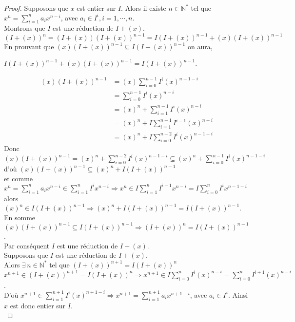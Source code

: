 \begin{proof}
	Supposons que $x$ est entier sur $I$. Alors il existe $n \in \mathbb{N^*}$ tel que $x^n = \displaystyle \sum_{i=1}^{n}{a_i x^{n-i}}$, avec $a_i \in I^i, i=1, \cdots ,n$.\\
	Montrons que $I$ est une réduction de $I + (x)$.\\
	$(I+(x))^n = (I+(x))(I+(x))^{n-1}= I(I+(x))^{n-1} + (x)(I+(x))^{n-1}$\\
	En prouvant que $(x)(I+(x))^{n-1} \subseteq I(I+(x))^{n-1}$ on aura,
	\begin{center}
		$I(I+(x))^{n-1} + (x)(I+(x))^{n-1} = I(I+(x))^{n-1}$.
	\end{center}
	\begin{align*}
		(x)(I+(x))^{n-1} &= (x)\displaystyle \sum_{i=0}^{n-1}{I^i (x)^{n-1-i}}\\
		&= \displaystyle \sum_{i=0}^{n-1}{I^i (x)^{n-i}}\\
		&= (x)^n + \displaystyle \sum_{i=1}^{n-1}{I^i (x)^{n-i}}\\
		&= (x)^n + I\displaystyle \sum_{i=1}^{n-1}{I^{i-1} (x)^{n-i}}\\
		&= (x)^n + I\displaystyle \sum_{i=0}^{n-2}{I^i (x)^{n-1-i}}
	\end{align*}
	Donc $(x)(I+(x))^{n-1} = (x)^n + \displaystyle \sum_{i=0}^{n-2}{I^i (x)^{n-1-i}} \subseteq (x)^n + \displaystyle \sum_{i=0}^{n-1}{I^i (x)^{n-1-i}}$\\
	d'où $(x)(I+(x))^{n-1} \subseteq (x)^n + I(I+(x))^{n-1}$\\ et comme $x^n = \displaystyle \sum_{i=1}^{n}{a_i x^{n-i}} \in \displaystyle \sum_{i=1}^{n}{I^i x^{n-i}} \Rightarrow x^n \in I\displaystyle \sum_{i=1}^{n}{I^{i-1} x^{n-i}} = I\displaystyle \sum_{i=0}^{n}{I^i x^{n-1-i}}$\\
	alors $(x)^n \in I(I+(x))^{n-1} \Rightarrow (x)^n + I(I+(x))^{n-1} = I(I+(x))^{n-1}$.\\
	En somme $(x)(I+(x))^{n-1} \subseteq I(I+(x))^{n-1} \Rightarrow (I+(x))^{n} = I(I+(x))^{n-1}$.\\
	Par conséquent $I$ est une réduction de $I + (x)$.\\
	Supposons que $I$ est une réduction de $I + (x)$.\\
	Alors $\exists \, n \in \mathbb{N^*}$ tel que $(I + (x))^{n+1} = I(I + (x))^{n}$\\
	$x^{n+1} \in (I + (x))^{n+1} = I(I + (x))^{n} \Rightarrow x^{n+1} \in I\displaystyle \sum_{i=0}^{n}{I^i (x)^{n-i}} = \displaystyle \sum_{i=0}^{n}{I^{i+1} (x)^{n-i}}$.\\
	D'où $x^{n+1} \in \displaystyle \sum_{i=1}^{n+1}{I^i (x)^{n+1-i}} \Rightarrow x^{n+1} =  \displaystyle \sum_{i=1}^{n+1}{a_i x^{n+1-i}}$, avec $a_i \in I^i$. Ainsi $x$ est donc entier sur $I$.\\
\end{proof}
